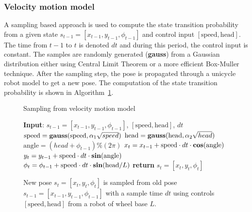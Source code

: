\subsubsection{Velocity motion model}
A sampling based approach is used to compute the state transition probability from a given state $s_{t-1}=[x_{t-1},y_{t-1},\phi_{t-1}]$ and control input $[\text{speed},\text{head}]$. The time from $t-1$ to $t$ is denoted $dt$ and during this period, the control input is constant. The samples are randomly generated (\textbf{gauss}) from a Gaussian distribution either using Central Limit Theorem or a more efficient Box-Muller technique. After the sampling step, the pose is propagated through a unicycle robot model to get a new pose. The computation of the state transition probability is shown in Algorithm~\ref{alg_vel}.

\begin{figure}
\begin{algorithm}[H]
\caption{Sampling from velocity motion model}\label{alg_vel}
\begin{algorithmic}[1]
\BState \textbf{Input}: $s_{t-1}=[x_{t-1},y_{t-1},\phi_{t-1}]$, $[\text{speed},\text{head}]$, $dt$
\State $\mathrm{speed} = {\bf gauss}(\text{speed},\alpha_1\sqrt{speed})$
\State $\mathrm{head} = {\bf gauss}(\text{head},\alpha_2\sqrt{head})$
\EndProcedure
{}
\State $\mathrm{angle} = (head + \phi_{t-1})\%(2\pi)$
\State $x_t = x_{t-1} + \mathrm{speed}\cdot dt\cdot{\bf cos}(\mathrm{angle})$
\State $y_t = y_{t-1} + \mathrm{speed}\cdot dt\cdot{\bf sin}(\mathrm{angle})$
\State $\phi_t = \phi_{t-1} + \mathrm{speed}\cdot dt\cdot{\bf sin}(\mathrm{head}/L)$
\State \textbf{return} $s_t=[x_t,y_t,\phi_t]$
\EndProcedure
\end{algorithmic}
\end{algorithm}
\caption[Sampling algorithm using velocity motion model]{New pose $s_t=[x_t,y_t,\phi_t]$ is sampled from old pose $s_{t-1}=[x_{t-1},y_{t-1},\phi_{t-1}]$ with a sample time $dt$ using controls $[\text{speed},\text{head}]$ from a robot of wheel base $L$.}
\end{figure}

